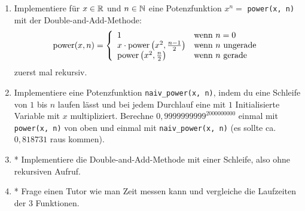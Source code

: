 \begin{aufg}
\begin{enumerate}[leftmargin=*]
\item Implementiere für $x \in \mathbb{R}$ und $n \in \mathbb{N}$ eine Potenzfunktion $x^n=$ \verb|power(x, n)| mit der Double-and-Add-Methode: \[
	\mathrm{power}(x, n) = \left\{ \begin{array}{ll}
	1 & \text{wenn } n = 0 \\
	x \cdot \mathrm{power}\left(x^2, \frac{n-1}{2}\right) & \text{wenn } n \text{ ungerade} \\
	\mathrm{power}\left(x^2, \frac{n}{2}\right) & \text{wenn } n \text{ gerade} \\
	\end{array}
	\right.
\]
zuerst mal rekursiv. 
\item Implementiere eine Potenzfunktion \verb|naiv_power(x, n)|, indem du eine Schleife von $1$ bis $n$ laufen lässt und bei jedem Durchlauf eine mit $1$ Initialisierte Variable mit $x$ multipliziert. Berechne $0,9999999999^{2000000000}$ einmal mit \verb|power(x, n)| von oben und einmal mit \verb|naiv_power(x, n)| (es sollte ca. $0,818731$ raus kommen). 
\item* Implementiere die Double-and-Add-Methode mit einer Schleife, also ohne rekursiven Aufruf.
\item* Frage einen Tutor wie man Zeit messen kann und vergleiche die Laufzeiten der 3 Funktionen.
\end{enumerate}
\end{aufg}
